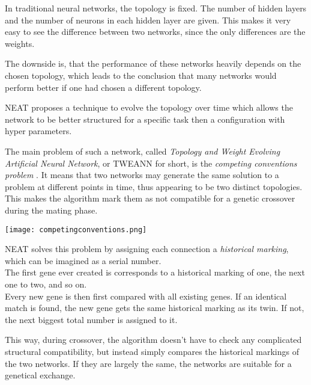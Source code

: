 In traditional neural networks, the topology is fixed. The number of hidden layers and the number of neurons in each hidden layer are given. This makes it very easy to see the difference between two networks, since the only differences are the weights.

The downside is, that the performance of these networks heavily depends on the chosen topology, which leads to the conclusion that many networks would perform better if one had chosen a different topology.

NEAT proposes a technique to evolve the topology over time which allows the network to be better structured for a specific task then a configuration with hyper parameters.

The main problem of such a network, called \emph{Topology and Weight Evolving
Artificial Neural Network}, or TWEANN for short, is the \emph{competing conventions problem} \cite{Stanley2002}.
It means that two networks may generate the same solution to a problem at different points in time, thus appearing to be two distinct topologies.\\
This makes the algorithm mark them as not compatible for a genetic crossover during the mating phase.

\texttt{[image: competingconventions.png]}

NEAT solves this problem by assigning each connection a \emph{historical marking}, which can be imagined as a serial number.\\
The first gene ever created is corresponds to a historical marking of one, the next one to two, and so on.\\
Every new gene is then first compared with all existing genes. If an identical match is found, the new gene gets the same historical marking as its twin. If not, the next biggest total number is assigned to it.

This way, during crossover, the algorithm doesn't have to check any complicated structural compatibility, but instead simply compares the historical markings of the two networks. If they are largely the same, the networks are suitable for a genetical exchange.
